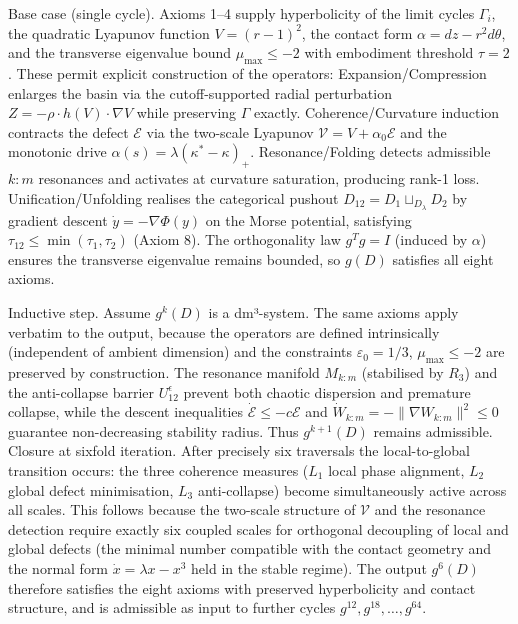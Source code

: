 Base case (single cycle). Axioms 1–4 supply hyperbolicity of the limit cycles $  \Gamma_i  $, the quadratic Lyapunov function $  V = (r-1)^2  $, the contact form $  \alpha = dz - r^2 d\theta  $, and the transverse eigenvalue bound $  \mu_{\max} \le -2  $ with embodiment threshold $  \tau = 2  $. These permit explicit construction of the operators:
Expansion/Compression enlarges the basin via the cutoff-supported radial perturbation $  Z = -\rho \cdot h(V) \cdot \nabla V  $ while preserving $  \Gamma  $ exactly.
Coherence/Curvature induction contracts the defect $  \mathcal{E}  $ via the two-scale Lyapunov $  \mathcal{V} = V + \alpha_0 \mathcal{E}  $ and the monotonic drive $  \alpha(s) = \lambda(\kappa^* - \kappa)_+  $.
Resonance/Folding detects admissible $  k:m  $ resonances and activates at curvature saturation, producing rank-1 loss.
Unification/Unfolding realises the categorical pushout $  D_{12} = D_1 \sqcup_{D_\lambda} D_2  $ by gradient descent $  \dot{y} = -\nabla \Phi(y)  $ on the Morse potential, satisfying $  \tau_{12} \le \min(\tau_1, \tau_2)  $ (Axiom 8).
The orthogonality law $  g^T g = I  $ (induced by $  \alpha  $) ensures the transverse eigenvalue remains bounded, so $  g(D)  $ satisfies all eight axioms.

Inductive step. Assume $  g^k(D)  $ is a dm³-system. The same axioms apply verbatim to the output, because the operators are defined intrinsically (independent of ambient dimension) and the constraints $  \varepsilon_0 = 1/3  $, $  \mu_{\max} \le -2  $ are preserved by construction. The resonance manifold $  M_{k:m}  $ (stabilised by $  R_3  $) and the anti-collapse barrier $  U_{12}^\epsilon  $ prevent both chaotic dispersion and premature collapse, while the descent inequalities $  \dot{\mathcal{E}} \le -c \mathcal{E}  $ and $  \dot{W}_{k:m} = -\|\nabla W_{k:m}\|^2 \le 0  $ guarantee non-decreasing stability radius. Thus $  g^{k+1}(D)  $ remains admissible.
Closure at sixfold iteration. After precisely six traversals the local-to-global transition occurs: the three coherence measures ($  L_1  $ local phase alignment, $  L_2  $ global defect minimisation, $  L_3  $ anti-collapse) become simultaneously active across all scales. This follows because the two-scale structure of $  \mathcal{V}  $ and the resonance detection require exactly six coupled scales for orthogonal decoupling of local and global defects (the minimal number compatible with the contact geometry and the normal form $  \dot{x} = \lambda x - x^3  $ held in the stable regime). The output $  g^6(D)  $ therefore satisfies the eight axioms with preserved hyperbolicity and contact structure, and is admissible as input to further cycles $  g^{12}, g^{18}, \dots, g^{64}  $.

